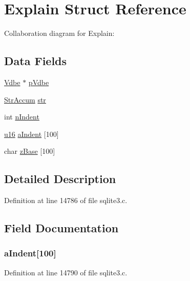 \hypertarget{struct_explain}{}\section{Explain Struct Reference}
\label{struct_explain}


Collaboration diagram for Explain\+:
\subsection*{Data Fields}
\begin{DoxyCompactItemize}
\item 
\hyperlink{struct_vdbe}{Vdbe} $\ast$ \hyperlink{struct_explain_ac73302f0c912cb7b3c9b1cea509e6077}{p\+Vdbe}
\item 
\hyperlink{struct_str_accum}{Str\+Accum} \hyperlink{struct_explain_a3f400d3c4528e03aed89b006fe4923e1}{str}
\item 
int \hyperlink{struct_explain_a43e7d552ac028ebbf1aae378433fd8cb}{n\+Indent}
\item 
\hyperlink{sqlite3_8c_a20f2299e322dcbde37cb07b16910b843}{u16} \hyperlink{struct_explain_a832dc85551edd935f99e6ba4ad13d857}{a\+Indent} \mbox{[}100\mbox{]}
\item 
char \hyperlink{struct_explain_a175ee71ac545913c8c3c5d9685b8f836}{z\+Base} \mbox{[}100\mbox{]}
\end{DoxyCompactItemize}


\subsection{Detailed Description}


Definition at line 14786 of file sqlite3.\+c.



\subsection{Field Documentation}
\hypertarget{struct_explain_a832dc85551edd935f99e6ba4ad13d857}{}
\subsubsection[{a\+Indent}]{ a\+Indent\mbox{[}100\mbox{]}}\label{struct_explain_a832dc85551edd935f99e6ba4ad13d857}


Definition at line 14790 of file sqlite3.\+c.

